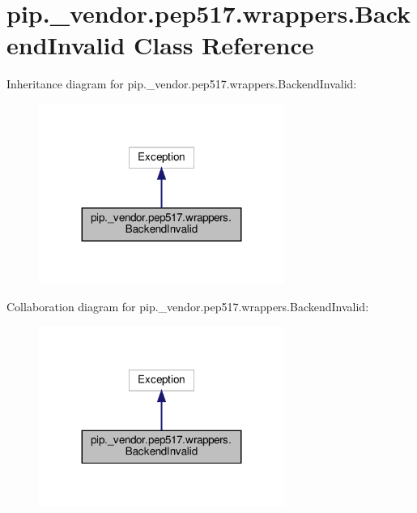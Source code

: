 \hypertarget{classpip_1_1__vendor_1_1pep517_1_1wrappers_1_1BackendInvalid}{}\section{pip.\+\_\+vendor.\+pep517.\+wrappers.\+Backend\+Invalid Class Reference}
\label{classpip_1_1__vendor_1_1pep517_1_1wrappers_1_1BackendInvalid}


Inheritance diagram for pip.\+\_\+vendor.\+pep517.\+wrappers.\+Backend\+Invalid\+:
\nopagebreak
\begin{figure}[H]
\begin{center}
\leavevmode
\includegraphics[width=227pt]{classpip_1_1__vendor_1_1pep517_1_1wrappers_1_1BackendInvalid__inherit__graph}
\end{center}
\end{figure}


Collaboration diagram for pip.\+\_\+vendor.\+pep517.\+wrappers.\+Backend\+Invalid\+:
\nopagebreak
\begin{figure}[H]
\begin{center}
\leavevmode
\includegraphics[width=227pt]{classpip_1_1__vendor_1_1pep517_1_1wrappers_1_1BackendInvalid__coll__graph}
\end{center}
\end{figure}
